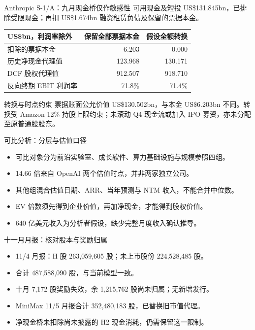 \documentclass[aspectratio=169,11pt]{beamer}
\newcommand{\smallnote}[1]{\vspace{0.2em}{\footnotesize #1}}
\begin{document}
\begin{frame}{Anthropic S-1/A：九月现金桥仅作敏感性}
  \small
  可用现金及短投 US\$131.845bn，已排除受限现金；再扣 US\$1.674bn 融资租赁负债及保留的票据本金。
  \begin{table}
    \begin{tabular}{lrr}
      \toprule
      US\$bn，利润率除外 & 保留全部票据本金 & 假设全额转换\\
      \midrule
      扣除的票据本金 & 6.203 & 0.000\\
      历史净现金代理值 & 123.968 & 130.171\\
      DCF 股权代理值 & 912.507 & 918.710\\
      反向终期 EBIT 利润率 & 71.8\% & 71.4\%\\
      \bottomrule
    \end{tabular}
  \end{table}
  \begin{block}{转换与时点约束}
    票据账面公允价值 US\$130.502bn，与本金 US\$6.203bn 不同。转换受 Amazon 12\% 持股上限约束；未滚动 Q4 现金流或加入 IPO 募资，亦未分配至原普通股股东。
  \end{block}
  \smallnote{S-1/A p168、F-6、附注 7。经营 DCF EV 仍为 US\$788.5bn；主模型保留十二月底净现金为零的假设，九月情景单列。}
\end{frame}

\begin{frame}{可比分析：分层与估值口径}
  \begin{itemize}
    \item 可比对象分为前沿实验室、成长软件、算力基础设施与规模参照四组。
    \item 14.66 倍来自 OpenAI 两个估值时点，并非两家独立公司。
    \item 其他组混合估值日期、ARR、当年预测与 NTM 收入，不能合并中位数。
    \item EV 倍数须先得到企业价值，再加净现金，才能得到股权价值。
    \item 640 亿美元收入为分析者假设，缺少完整月度收入确认推导。
  \end{itemize}
  \smallnote{智谱核心可比组采用已完成的融资交易；各组倍数仅在口径一致时比较。}
\end{frame}

\begin{frame}{十一月月报：核对股本与奖励归属}
  \begin{itemize}
    \item 11/4 月报：H 股 263,059,605 股；未上市股份 224,528,485 股。
    \item 合计 487,588,090 股，与当前模型一致。
    \item 十月 7,172 股奖励失效，余 1,215,762 股尚未归属；无新增发行。
    \item MiniMax 11/5 月报合计 352,480,183 股，已替换旧市值代理。
    \item 净现金桥未扣除尚未披露的 H2 现金消耗，仍需保留这一限制。
  \end{itemize}
  \smallnote{来源：HKEXnews 智谱 11/4 与 MiniMax 11/5 十月月报。}
\end{frame}
\end{document}
